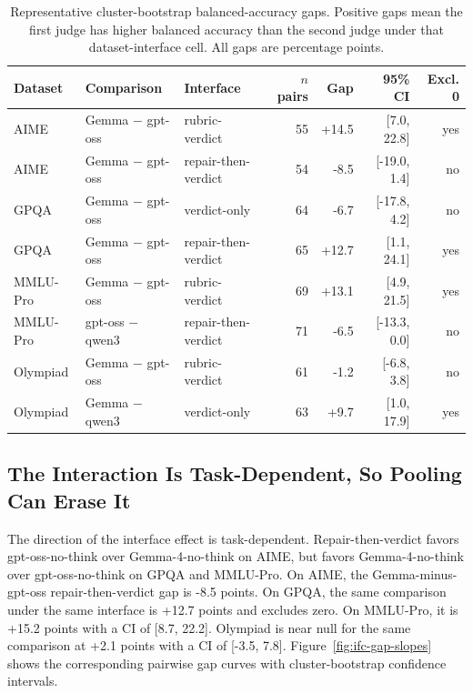 \documentclass[journal]{IEEEtran}
\begin{document}
\begin{table}[t]
\centering
\footnotesize
\setlength{\tabcolsep}{4pt}
\begin{tabular}{lllrrrr}
\toprule
Dataset & Comparison & Interface & $n$ pairs & Gap & 95\% CI & Excl. 0 \\
\midrule
AIME & Gemma $-$ gpt-oss & rubric-verdict & 55 & +14.5 & [7.0, 22.8] & yes \\
AIME & Gemma $-$ gpt-oss & repair-then-verdict & 54 & -8.5 & [-19.0, 1.4] & no \\
GPQA & Gemma $-$ gpt-oss & verdict-only & 64 & -6.7 & [-17.8, 4.2] & no \\
GPQA & Gemma $-$ gpt-oss & repair-then-verdict & 65 & +12.7 & [1.1, 24.1] & yes \\
MMLU-Pro & Gemma $-$ gpt-oss & rubric-verdict & 69 & +13.1 & [4.9, 21.5] & yes \\
MMLU-Pro & gpt-oss $-$ qwen3 & repair-then-verdict & 71 & -6.5 & [-13.3, 0.0] & no \\
Olympiad & Gemma $-$ gpt-oss & rubric-verdict & 61 & -1.2 & [-6.8, 3.8] & no \\
Olympiad & Gemma $-$ qwen3 & verdict-only & 63 & +9.7 & [1.0, 17.9] & yes \\
\bottomrule
\end{tabular}
\caption{Representative cluster-bootstrap balanced-accuracy gaps. Positive gaps mean the first judge has higher balanced accuracy than the second judge under that dataset-interface cell. All gaps are percentage points.}
\label{tab:ifc-gaps}
\end{table}

\subsection{The Interaction Is Task-Dependent, So Pooling Can Erase It}
\label{sec:results-task-dependent}

The direction of the interface effect is task-dependent. Repair-then-verdict favors gpt-oss-no-think over Gemma-4-no-think on AIME, but favors Gemma-4-no-think over gpt-oss-no-think on GPQA and MMLU-Pro. On AIME, the Gemma-minus-gpt-oss repair-then-verdict gap is -8.5 points. On GPQA, the same comparison under the same interface is +12.7 points and excludes zero. On MMLU-Pro, it is +15.2 points with a CI of [8.7, 22.2]. Olympiad is near null for the same comparison at +2.1 points with a CI of [-3.5, 7.8]. Figure~\ref{fig:ifc-gap-slopes} shows the corresponding pairwise gap curves with cluster-bootstrap confidence intervals.
\end{document}

